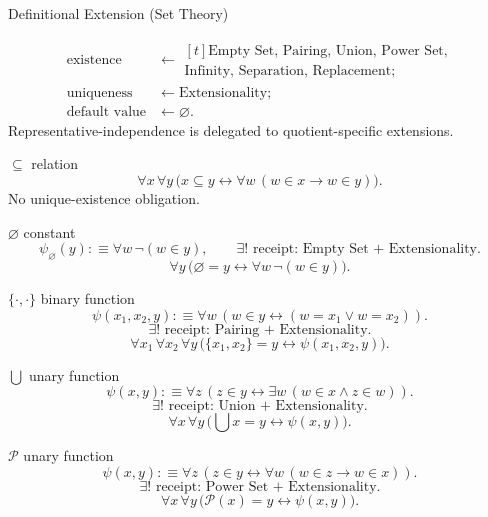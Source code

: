 \begin{modelbox}{Definitional Extension (Set Theory)}

\begin{modeldeltablock}
\begin{align*}
  \text{existence} &\leftarrow
  \begin{gathered}[t]
    \text{Empty Set, Pairing, Union, Power Set,}\\
    \text{Infinity, Separation, Replacement};
  \end{gathered}\\
  \text{uniqueness} &\leftarrow \text{Extensionality};\\
  \text{default value} &\leftarrow \varnothing.
\end{align*}
Representative-independence is delegated to quotient-specific extensions.
\end{modeldeltablock}

\begin{modelinstancesblock}
\textbf{\(\subseteq\)} relation
\[
\forall x\,\forall y\,
\bigl(x\subseteq y\leftrightarrow
  \forall w\,(w\in x\to w\in y)\bigr).
\]
No unique-existence obligation.

\textbf{\(\varnothing\)} constant
\[
\psi_{\varnothing}(y):\equiv \forall w\,\neg(w\in y),
\qquad
\exists!\text{ receipt: Empty Set + Extensionality}.
\]
\[
\forall y\,
\bigl(\varnothing=y\leftrightarrow \forall w\,\neg(w\in y)\bigr).
\]

\textbf{\(\{\cdot,\cdot\}\)} binary function
\[
\psi(x_1,x_2,y):\equiv
\forall w\,(w\in y\leftrightarrow (w=x_1\vee w=x_2)).
\]
\[
\exists!\text{ receipt: Pairing + Extensionality}.
\]
\[
\forall x_1\,\forall x_2\,\forall y\,
\bigl(\{x_1,x_2\}=y\leftrightarrow\psi(x_1,x_2,y)\bigr).
\]

\textbf{\(\bigcup\)} unary function
\[
\psi(x,y):\equiv
\forall z\,(z\in y\leftrightarrow\exists w\,(w\in x\wedge z\in w)).
\]
\[
\exists!\text{ receipt: Union + Extensionality}.
\]
\[
\forall x\,\forall y\,
\bigl(\textstyle\bigcup x=y\leftrightarrow\psi(x,y)\bigr).
\]

\textbf{\(\mathcal P\)} unary function
\[
\psi(x,y):\equiv
\forall z\,(z\in y\leftrightarrow\forall w\,(w\in z\to w\in x)).
\]
\[
\exists!\text{ receipt: Power Set + Extensionality}.
\]
\[
\forall x\,\forall y\,
\bigl(\mathcal P(x)=y\leftrightarrow\psi(x,y)\bigr).
\]
\end{modelinstancesblock}
\end{modelbox}
